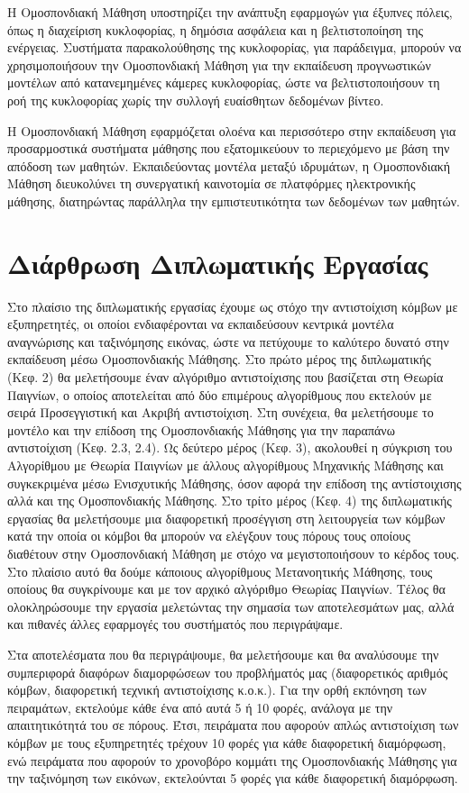 Η Ομοσπονδιακή Μάθηση υποστηρίζει την ανάπτυξη εφαρμογών για έξυπνες πόλεις, όπως η διαχείριση κυκλοφορίας, η δημόσια ασφάλεια και η βελτιστοποίηση της ενέργειας. Συστήματα παρακολούθησης της κυκλοφορίας, για παράδειγμα, μπορούν να χρησιμοποιήσουν την Ομοσπονδιακή Μάθηση για την εκπαίδευση προγνωστικών μοντέλων από κατανεμημένες κάμερες κυκλοφορίας, ώστε να βελτιστοποιήσουν τη ροή της κυκλοφορίας χωρίς την συλλογή ευαίσθητων δεδομένων βίντεο.

Η Ομοσπονδιακή Μάθηση εφαρμόζεται ολοένα και περισσότερο στην εκπαίδευση για προσαρμοστικά συστήματα μάθησης που εξατομικεύουν το περιεχόμενο με βάση την απόδοση των μαθητών. Εκπαιδεύοντας μοντέλα μεταξύ ιδρυμάτων, η Ομοσπονδιακή Μάθηση διευκολύνει τη συνεργατική καινοτομία σε πλατφόρμες ηλεκτρονικής μάθησης, διατηρώντας παράλληλα την εμπιστευτικότητα των δεδομένων των μαθητών.

\section{Διάρθρωση Διπλωματικής Εργασίας}

Στο πλαίσιο της διπλωματικής εργασίας έχουμε ως στόχο την αντιστοίχιση κόμβων με εξυπηρετητές, οι οποίοι ενδιαφέρονται να εκπαιδεύσουν κεντρικά μοντέλα αναγνώρισης και ταξινόμησης εικόνας, ώστε να πετύχουμε το καλύτερο δυνατό στην εκπαίδευση μέσω Ομοσπονδιακής Μάθησης. Στο πρώτο μέρος της διπλωματικής (Κεφ. 2) θα μελετήσουμε έναν αλγόριθμο αντιστοίχισης που βασίζεται στη Θεωρία Παιγνίων, ο οποίος αποτελείται από δύο επιμέρους αλγορίθμους που εκτελούν με σειρά Προσεγγιστική και Ακριβή αντιστοίχιση. Στη συνέχεια, θα μελετήσουμε το μοντέλο και την επίδοση της Ομοσπονδιακής Μάθησης για την παραπάνω αντιστοίχιση (Κεφ. 2.3, 2.4). Ως δεύτερο μέρος (Κεφ. 3), ακολουθεί η σύγκριση του Αλγορίθμου με Θεωρία Παιγνίων με άλλους αλγορίθμους Μηχανικής Μάθησης και συγκεκριμένα μέσω Ενισχυτικής Μάθησης, όσον αφορά την επίδοση της αντίστοιχισης αλλά και της Ομοσπονδιακής Μάθησης. Στο τρίτο μέρος (Κεφ. 4) της διπλωματικής εργασίας θα μελετήσουμε μια διαφορετική προσέγγιση στη λειτουργεία των κόμβων κατά την οποία οι κόμβοι θα μπορούν να ελέγξουν τους πόρους τους οποίους διαθέτουν στην Ομοσπονδιακή Μάθηση με στόχο να μεγιστοποιήσουν το κέρδος τους. Στο πλαίσιο αυτό θα δούμε κάποιους αλγορίθμους Μετανοητικής Μάθησης, τους οποίους θα συγκρίνουμε και με τον αρχικό αλγόριθμο Θεωρίας Παιγνίων. Τέλος θα ολοκληρώσουμε την εργασία μελετώντας την σημασία των αποτελεσμάτων μας, αλλά και πιθανές άλλες εφαρμογές του συστήματός που περιγράψαμε.

Στα αποτελέσματα που θα περιγράψουμε, θα μελετήσουμε και θα αναλύσουμε την συμπεριφορά διαφόρων διαμορφώσεων του προβλήματός μας (διαφορετικός αριθμός κόμβων, διαφορετική τεχνική αντιστοίχισης κ.ο.κ.). Για την ορθή εκπόνηση των πειραμάτων, εκτελούμε κάθε ένα από αυτά 5 ή 10 φορές, ανάλογα με την απαιτητικότητά του σε πόρους. Έτσι, πειράματα που αφορούν απλώς αντιστοίχιση των κόμβων με τους εξυπηρετητές τρέχουν 10 φορές για κάθε διαφορετική διαμόρφωση, ενώ πειράματα που αφορούν το χρονοβόρο κομμάτι της Ομοσπονδιακής Μάθησης για την ταξινόμηση των εικόνων, εκτελούνται 5 φορές για κάθε διαφορετική διαμόρφωση.